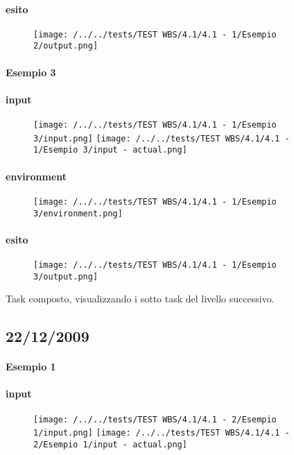 \paragraph{esito}
\begin{figure}
\centering
\texttt{[image: /../../tests/TEST WBS/4.1/4.1 - 1/Esempio 2/output.png]}
\end{figure}

\paragraph{Esempio 3}
\paragraph{input}
\begin{figure}
\centering
\texttt{[image: /../../tests/TEST WBS/4.1/4.1 - 1/Esempio 3/input.png]}
\texttt{[image: /../../tests/TEST WBS/4.1/4.1 - 1/Esempio 3/input - actual.png]}
\end{figure}
\paragraph{environment}
\begin{figure}
\centering
\texttt{[image: /../../tests/TEST WBS/4.1/4.1 - 1/Esempio 3/environment.png]}
\end{figure}
\paragraph{esito}
\begin{figure}
\centering
\texttt{[image: /../../tests/TEST WBS/4.1/4.1 - 1/Esempio 3/output.png]}
\end{figure}

Task composto, visualizzando i sotto task del livello successivo.

\subsection{22/12/2009}
\paragraph{Esempio 1}
\paragraph{input}
\begin{figure}
\centering
\texttt{[image: /../../tests/TEST WBS/4.1/4.1 - 2/Esempio 1/input.png]}
\texttt{[image: /../../tests/TEST WBS/4.1/4.1 - 2/Esempio 1/input - actual.png]}
\end{figure}
